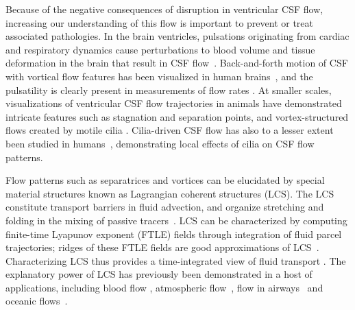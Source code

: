 \documentclass{template}
\begin{document}
Because of the negative consequences of disruption in
ventricular CSF flow, increasing our understanding of
this flow is important to prevent or treat associated 
pathologies. In the brain ventricles, 
pulsations originating from cardiac and respiratory dynamics
cause perturbations to blood volume and tissue deformation
in the brain that result in 
CSF flow~\cite{enzmann1991normal,
wagshul2011pulsating, Liu2024UsingBreathing, baledent2004relationship,
greitz1992pulsatile, Vinje2019RespiratoryMeasurements,
kelley2023cerebrospinal, greitz1993pulsatile}.
Back-and-forth motion of CSF with vortical flow features
has been visualized in human brains~\cite{stadlbauer2010insight},
and the pulsatility is clearly present in measurements of flow rates
\cite{baledent2004relationship, Liu2024UsingBreathing, Vinje2019RespiratoryMeasurements}.
At smaller scales, visualizations of ventricular
CSF flow trajectories in animals have demonstrated
intricate features such as stagnation and separation points,
and vortex-structured flows created by motile cilia
\cite{gilpin2017flowtrace, Faubel2016CiliaVentricles,
Olstad2019CiliaryDevelopment}.
Cilia-driven CSF flow has also 
to a lesser extent been studied in humans~\cite{worthington1963ependymal,
Yoshida2022EffectVentricles, Siyahhan2014FlowVentricles},
demonstrating local effects of cilia on CSF flow patterns.

Flow patterns such as separatrices and vortices can be elucidated by special
material structures known as Lagrangian coherent
structures (LCS). The LCS constitute transport barriers in
fluid advection, and organize stretching and 
folding in the mixing of passive tracers~\cite{haller2015lagrangian,
haller2000lagrangian}. LCS can be characterized by computing
finite-time Lyapunov exponent (FTLE) fields through integration of fluid
parcel trajectories; ridges of these FTLE fields are good approximations of
LCS~\cite{shadden2005definition}. Characterizing LCS thus provides
a time-integrated view of fluid transport
\cite{shadden2005definition, haller2015lagrangian, haller2000lagrangian}.
The explanatory power of LCS has previously been demonstrated
in a host of applications, including blood flow
\cite{shadden2008characterization, shadden2010computational},
atmospheric flow~\cite{Gunther2021LagrangianWinds},
flow in airways~\cite{lukens2010using}
and oceanic flows~\cite{beron2015dissipative}.
\end{document}
